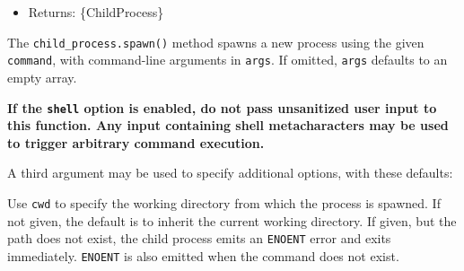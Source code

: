 \begin{itemize}
\begin{itemize}
  \item
    \texttt{windowsVerbatimArguments} \{boolean\} No quoting or escaping
    of arguments is done on Windows. Ignored on Unix. This is set to
    \texttt{true} automatically when \texttt{shell} is specified and is
    CMD. \textbf{Default:} \texttt{false}.
  \item
    \texttt{windowsHide} \{boolean\} Hide the subprocess console window
    that would normally be created on Windows systems. \textbf{Default:}
    \texttt{false}.
  \item
    \texttt{signal} \{AbortSignal\} allows aborting the child process
    using an AbortSignal.
  \item
    \texttt{timeout} \{number\} In milliseconds the maximum amount of
    time the process is allowed to run. \textbf{Default:}
    \texttt{undefined}.
  \item
    \texttt{killSignal} \{string\textbar integer\} The signal value to
    be used when the spawned process will be killed by timeout or abort
    signal. \textbf{Default:}
    \texttt{\textquotesingle{}SIGTERM\textquotesingle{}}.
  \end{itemize}
\item
  Returns: \{ChildProcess\}
\end{itemize}

The \texttt{child\_process.spawn()} method spawns a new process using
the given \texttt{command}, with command-line arguments in
\texttt{args}. If omitted, \texttt{args} defaults to an empty array.

\textbf{If the \texttt{shell} option is enabled, do not pass unsanitized
user input to this function. Any input containing shell metacharacters
may be used to trigger arbitrary command execution.}

A third argument may be used to specify additional options, with these
defaults:

\begin{Shaded}
\begin{Highlighting}[]
\OperatorTok{=}\NormalTok{ \{}
  \OperatorTok{:} \OperatorTok{,}
  \OperatorTok{:} \OperatorTok{,}
\NormalTok{\}}\OperatorTok{;}
\end{Highlighting}
\end{Shaded}

Use \texttt{cwd} to specify the working directory from which the process
is spawned. If not given, the default is to inherit the current working
directory. If given, but the path does not exist, the child process
emits an \texttt{ENOENT} error and exits immediately. \texttt{ENOENT} is
also emitted when the command does not exist.

